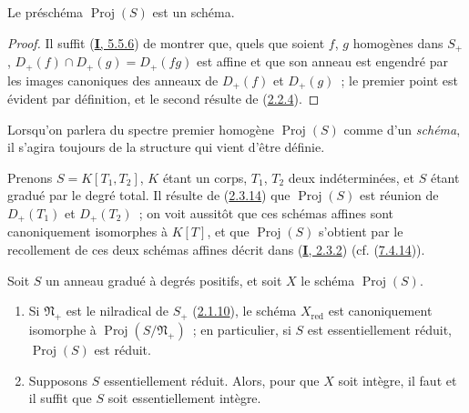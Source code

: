 \begin{proposition}[2.4.2]
\label{II.2.4.2-fr}
Le préschéma $\operatorname{Proj}(S)$ est un schéma.
\end{proposition}

\begin{proof}
Il suffit (\hyperref[I.5.5.6-fr]{\textbf{I}, 5.5.6}) de montrer que, quels que soient
$f$, $g$ homogènes dans $S_+$,
$D_+(f)\cap D_+(g)=D_+(fg)$ est affine et que son anneau est engendré par
les images canoniques des anneaux de $D_+(f)$ et $D_+(g)$~; le premier
point est évident par définition, et le second résulte de
(\hyperref[II.2.2.4-fr]{2.2.4}).
\end{proof}
Lorsqu'on parlera du spectre premier homogène $\operatorname{Proj}(S)$ comme
d'un \emph{schéma}, il s'agira toujours de la structure qui vient d'être
définie.

\begin{example}[2.4.3]
\label{II.2.4.3-fr}
Prenons $S=K[T_1,T_2]$, $K$ étant un corps, $T_1$, $T_2$ deux
indéterminées, et $S$ étant gradué par le degré total. Il résulte de
(\hyperref[II.2.3.14-fr]{2.3.14}) que $\operatorname{Proj}(S)$ est réunion
de $D_+(T_1)$ et $D_+(T_2)$~; on voit aussitôt que ces schémas affines sont
canoniquement isomorphes à $K[T]$, et que $\operatorname{Proj}(S)$
s'obtient par le recollement de ces deux schémas affines décrit dans
(\hyperref[I.2.3.2-fr]{\textbf{I}, 2.3.2}) (cf.
(\hyperref[II.7.4.14-fr]{7.4.14})).
\end{example}

\begin{proposition}[2.4.4]
\label{II.2.4.4-fr}
Soit $S$ un anneau gradué à degrés positifs, et soit $X$ le schéma
$\operatorname{Proj}(S)$.
\begin{enumerate}
  \item[\rm(i)] Si $\mathfrak{N}_+$ est le nilradical de $S_+$
    \textup{(\hyperref[II.2.1.10-fr]{2.1.10})}, le schéma $X_{\mathrm{red}}$ est
    canoniquement isomorphe à $\operatorname{Proj}(S/\mathfrak{N}_+)$~; en
    particulier, si $S$ est essentiellement réduit,
    $\operatorname{Proj}(S)$ est réduit.
  \item[\rm(ii)] Supposons $S$ essentiellement réduit. Alors, pour que $X$
    soit intègre, il faut et il suffit que $S$ soit essentiellement intègre.
\end{enumerate}
\end{proposition}

